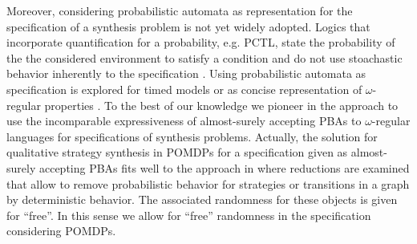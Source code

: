 Moreover, considering probabilistic automata as representation for the
specification of a synthesis problem is not yet widely adopted. Logics that
incorporate quantification for a probability, e.g. \textsc{PCTL}, state the
probability of the the considered environment to satisfy a condition and do not
use stoachastic behavior inherently to the specification \cite{PrinciplesOfMC}.
Using probabilistic automata as specification is explored for timed models
\cite{VerificationAndControl} or as concise representation of $\omega$-regular
properties \cite{PBAforLTLSafety}. To the best of our knowledge we pioneer in
the approach to use the incomparable expressiveness of almost-surely accepting
\aclp*{PBA} to $\omega$-regular languages for specifications of synthesis
problems. Actually, the solution for qualitative strategy synthesis in
\aclp*{POMDP} for a specification given as almost-surely accepting \aclp*{PBA}
fits well to the approach in \cite{RandomnessForFree} where reductions are
examined that allow to remove probabilistic behavior for strategies or
transitions in a graph by deterministic behavior. The associated randomness for
these objects is given for \enquote{free}. In this sense we allow for
\enquote{free} randomness in the specification considering \aclp*{POMDP}.
